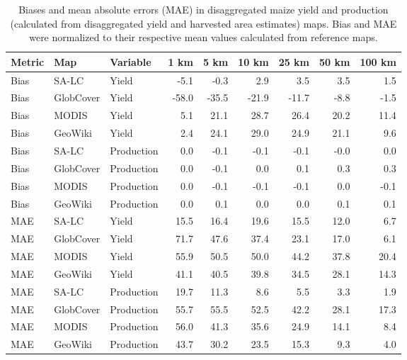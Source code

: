 \begin{longtable}{lllrrrrrr}
\caption{Biases and mean absolute errors (MAE) in disaggregated maize yield and production (calculated from disaggregated yield and harvested area estimates) maps. Bias and MAE were normalized to their respective mean values calculated from reference maps.} \\ 
  \hline
Metric & Map & Variable & 1 km & 5 km & 10 km & 25 km & 50 km & 100 km \\ 
  \hline
Bias & SA-LC & Yield & -5.1 & -0.3 & 2.9 & 3.5 & 3.5 & 1.5 \\ 
  Bias & GlobCover & Yield & -58.0 & -35.5 & -21.9 & -11.7 & -8.8 & -1.5 \\ 
  Bias & MODIS & Yield & 5.1 & 21.1 & 28.7 & 26.4 & 20.2 & 11.4 \\ 
  Bias & GeoWiki & Yield & 2.4 & 24.1 & 29.0 & 24.9 & 21.1 & 9.6 \\ 
  Bias & SA-LC & Production & 0.0 & -0.1 & -0.1 & -0.1 & -0.0 & 0.0 \\ 
  Bias & GlobCover & Production & 0.0 & -0.1 & 0.0 & 0.1 & 0.3 & 0.3 \\ 
  Bias & MODIS & Production & 0.0 & -0.1 & -0.1 & -0.1 & 0.0 & -0.1 \\ 
  Bias & GeoWiki & Production & 0.0 & 0.1 & 0.0 & 0.0 & 0.1 & 0.1 \\ 
  MAE & SA-LC & Yield & 15.5 & 16.4 & 19.6 & 15.5 & 12.0 & 6.7 \\ 
  MAE & GlobCover & Yield & 71.7 & 47.6 & 37.4 & 23.1 & 17.0 & 6.1 \\ 
  MAE & MODIS & Yield & 55.9 & 50.5 & 50.0 & 44.2 & 37.8 & 20.4 \\ 
  MAE & GeoWiki & Yield & 41.1 & 40.5 & 39.8 & 34.5 & 28.1 & 14.3 \\ 
  MAE & SA-LC & Production & 19.7 & 11.3 & 8.6 & 5.5 & 3.3 & 1.9 \\ 
  MAE & GlobCover & Production & 55.7 & 55.5 & 52.5 & 42.2 & 28.1 & 17.3 \\ 
  MAE & MODIS & Production & 56.0 & 41.3 & 35.6 & 24.9 & 14.1 & 8.4 \\ 
  MAE & GeoWiki & Production & 43.7 & 30.2 & 23.5 & 15.3 & 9.3 & 4.0 \\ 
   \hline
\hline
\end{longtable}

